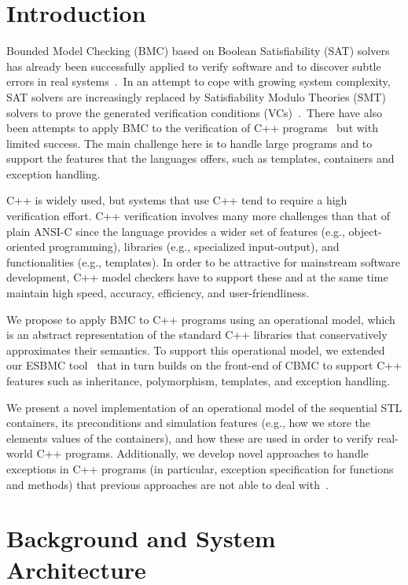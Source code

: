 \documentclass[a4paper]{llncs}
\begin{document}
\section{Introduction}
%
Bounded Model Checking (BMC) based on Boolean Satisfiability (SAT) solvers
has already been successfully applied to verify software and to discover
subtle errors in real systems~\cite{handbook09}.\ In an attempt to cope
with growing system complexity, SAT solvers are increasingly
replaced by Satisfiability Modulo Theories (SMT) solvers to prove the generated
verification conditions (VCs)~\cite{Armando09,Ganai06,Cordeiro12}.\
There have also been attempts to apply BMC to the verification of C++
programs~\cite{Florian12,Yang12} but with limited success. The main challenge here is to handle large
programs and to support the features that the languages offers, such as templates,
containers and exception handling.

C++ is widely used, but systems that use C++
tend to require a high verification effort. C++
verification involves many more challenges than that of plain ANSI-C since the language provides
a wider set of features (e.g., object-oriented programming), libraries (e.g., specialized
input-output), and functionalities (e.g., templates). In order to be attractive for mainstream software development,
C++ model checkers have to support these and at the same time maintain
high speed, accuracy, efficiency, and user-friendliness.


We propose to apply
BMC to C++ programs using an operational model,  which
is an abstract representation of the standard C++ libraries that
conservatively approximates their semantics. To support this operational model, we extended
our ESBMC tool~\cite{Cordeiro12} that in turn builds on
the front-end of CBMC \cite{Clarke04} to support C++ features such
as inheritance, polymorphism, templates, and exception handling.

We present a novel implementation of an operational model of the sequential STL
containers, its preconditions and simulation features (e.g., how we store the
elements values of the containers), and how these are used in order to verify
real-world C++ programs.  Additionally, we develop novel approaches to handle
exceptions in C++ programs (in particular, exception specification for
functions and methods) that previous approaches are not able to deal
with~\cite{PrabhuMBIG11,Blanc07,Florian12}.
%
\section{Background and System Architecture}
\end{document}
